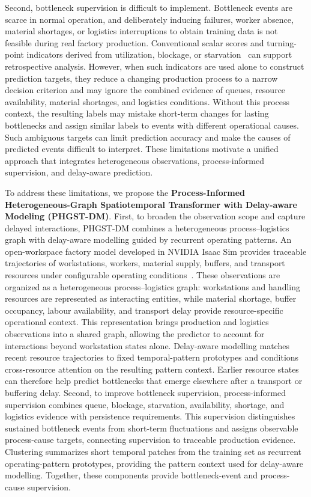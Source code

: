 \documentclass[a4paper,fleqn]{cas-dc}
\begin{document}
Second, bottleneck supervision is difficult to implement. Bottleneck events are scarce in normal operation, and deliberately inducing failures, worker absence, material shortages, or logistics interruptions to obtain training data is not feasible during real factory production. Conventional scalar scores and turning-point indicators derived from utilization, blockage, or starvation~\cite{subramaniyan2023throughput,lai2021data,su2022dynamic} can support retrospective analysis. However, when such indicators are used alone to construct prediction targets, they reduce a changing production process to a narrow decision criterion and may ignore the combined evidence of queues, resource availability, material shortages, and logistics conditions. Without this process context, the resulting labels may mistake short-term changes for lasting bottlenecks and assign similar labels to events with different operational causes. Such ambiguous targets can limit prediction accuracy and make the causes of predicted events difficult to interpret. These limitations motivate a unified approach that integrates heterogeneous observations, process-informed supervision, and delay-aware prediction.

To address these limitations, we propose the \textbf{Process-Informed Heterogeneous-Graph Spatiotemporal Transformer with Delay-aware Modeling (PHGST-DM)}. First, to broaden the observation scope and capture delayed interactions, PHGST-DM combines a heterogeneous process--logistics graph with delay-aware modelling guided by recurrent operating patterns. An open-workspace factory model developed in NVIDIA Isaac Sim provides traceable trajectories of workstations, workers, material supply, buffers, and transport resources under configurable operating conditions~\cite{lu2020digital,isaacsim2026,xue2026safe}. These observations are organized as a heterogeneous process--logistics graph: workstations and handling resources are represented as interacting entities, while material shortage, buffer occupancy, labour availability, and transport delay provide resource-specific operational context. This representation brings production and logistics observations into a shared graph, allowing the predictor to account for interactions beyond workstation states alone. Delay-aware modelling matches recent resource trajectories to fixed temporal-pattern prototypes and conditions cross-resource attention on the resulting pattern context. Earlier resource states can therefore help predict bottlenecks that emerge elsewhere after a transport or buffering delay. Second, to improve bottleneck supervision, process-informed supervision combines queue, blockage, starvation, availability, shortage, and logistics evidence with persistence requirements. This supervision distinguishes sustained bottleneck events from short-term fluctuations and assigns observable process-cause targets, connecting supervision to traceable production evidence. Clustering summarizes short temporal patches from the training set as recurrent operating-pattern prototypes, providing the pattern context used for delay-aware modelling. Together, these components provide bottleneck-event and process-cause supervision.
\end{document}
